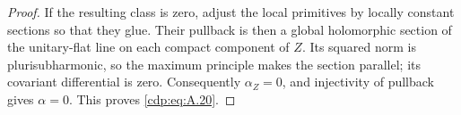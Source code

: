 \begin{proof}
If the resulting class is zero, adjust the local primitives by locally constant sections so that they glue. Their pullback is then a global holomorphic section of the unitary-flat line on each compact component of $Z$. Its squared norm is plurisubharmonic, so the maximum principle makes the section parallel; its covariant differential is zero. Consequently $\alpha_Z=0$, and injectivity of pullback gives $\alpha=0$. This proves \eqref{cdp:eq:A.20}.
\end{proof}


